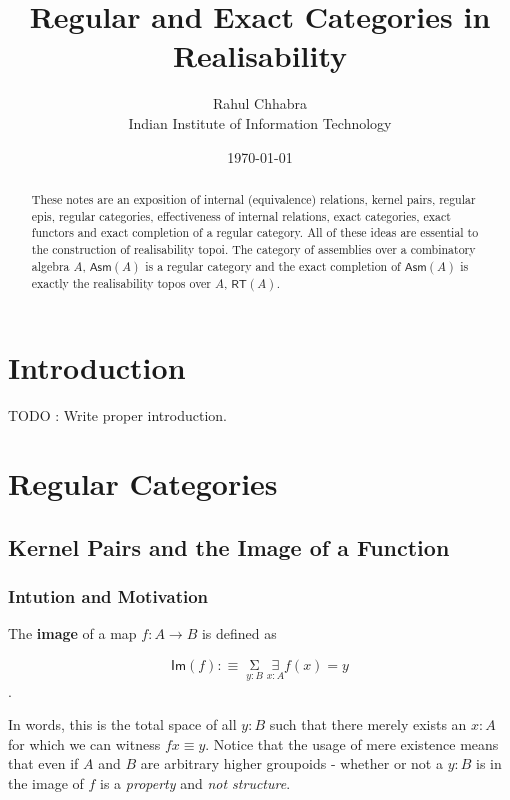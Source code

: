 \documentclass{article}
\newcommand{\cat}[1]{\mathsf{#1}}
\newcommand{\path}{\equiv}
\newcommand{\id}[1]{\mathsf{#1}}
\newcommand\orcidicon[1]{\href{https://orcid.org/#1}{\mbox{\scalerel*{
\begin{tikzpicture}[yscale=-1,transform shape]
\pic{orcidlogo};
\end{tikzpicture}
}{|}}}}
\begin{document}
\title{Regular and Exact Categories in Realisability}
\date{\today}
\author{Rahul Chhabra \orcidicon{0009-0007-7917-6461}\\
{Indian Institute of Information Technology\\}}
\maketitle
\begin{abstract}
    These notes are an exposition of internal (equivalence) relations, kernel pairs, regular epis, regular categories, effectiveness of internal relations, 
    exact categories, exact functors and exact completion of a regular category. All of these ideas are essential to the construction of realisability topoi. The category of assemblies over a 
    combinatory algebra $A$, $\cat{Asm}(A)$ is a regular category and the exact completion of $\cat{Asm}(A)$ is exactly the realisability topos over $A$, $\cat{RT}(A)$.
\end{abstract}

\section{Introduction}

TODO : Write proper introduction.

\section{Regular Categories}

\subsection{Kernel Pairs and the Image of a Function}

\subsubsection{Intution and Motivation}

The \textbf{image} of a map $f : A \to B$ is defined as 

\begin{equation*}
    \id{Im}(f) :\equiv \mathop{\Sigma}\limits_{y : B}^{} \mathop{\exists} \limits_{x : A}^{} f(x) = y 
\end{equation*}. 

In words, this is the total space of all $y : B$ such that there merely exists an $x : A$ for which we can witness $f x \path y$. 
Notice that the usage of mere existence means that even if $A$ and $B$ are arbitrary higher groupoids - whether or not a $y : B$ is in the image of $f$ is a \emph{property} and \emph{not structure}.
\end{document}
